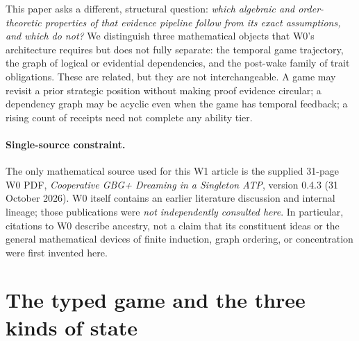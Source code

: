 \documentclass[11pt,letterpaper]{article}
\begin{document}
This paper asks a different, structural question: \emph{which algebraic and order-theoretic properties of that evidence pipeline follow from its exact assumptions, and which do not?} We distinguish three mathematical objects that W0's architecture requires but does not fully separate: the temporal game trajectory, the graph of logical or evidential dependencies, and the post-wake family of trait obligations. These are related, but they are not interchangeable. A game may revisit a prior strategic position without making proof evidence circular; a dependency graph may be acyclic even when the game has temporal feedback; a rising count of receipts need not complete any ability tier.

\paragraph{Single-source constraint.} The only mathematical source used for this W1 article is the supplied 31-page W0 PDF, \emph{Cooperative GBG+ Dreaming in a Singleton ATP}, version 0.4.3 (31 October 2026). W0 itself contains an earlier literature discussion and internal lineage; those publications were \emph{not independently consulted here}. In particular, citations to W0 describe ancestry, not a claim that its constituent ideas or the general mathematical devices of finite induction, graph ordering, or concentration were first invented here.

\section{The typed game and the three kinds of state}\label{gl-first-W1-s2}
\end{document}
